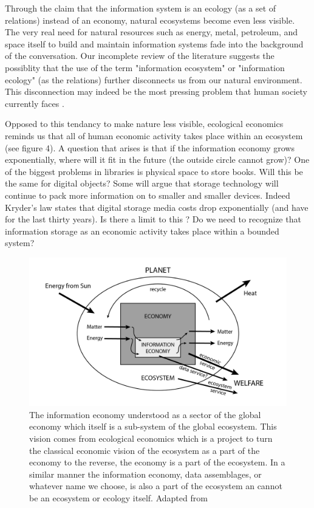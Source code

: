 Through the claim that the information system is an ecology (as a set of relations) instead of an economy, natural ecosystems become even less visible. The very real need for natural resources such as energy, metal, petroleum, and space itself to build and maintain information systems fade into the background of the conversation. Our incomplete review of the literature suggests the possiblity that the use of the term "information ecosystem" or "information ecology" (as the relations) further disconnects us from our natural environment.  This disconnection may indeed be the most pressing problem that human society currently faces \citep{worthy_2013}.

Opposed to this tendancy to make nature less visible, ecological economics reminds us that all of human economic activity takes place within an ecosystem (see figure 4).  A question that arises is that if the information economy grows exponentially, where will it fit in the future (the outside circle cannot grow)? One of the biggest problems in libraries is physical space to store books. Will this be the same for digital objects? Some will argue that storage technology will continue to pack more information on to smaller and smaller devices. Indeed Kryder's law states that digital storage media costs drop exponentially (and have for the last thirty years). Is there a limit to this \citep[cf.][]{rosenthal_2012}? Do we need to recognize that information storage as an economic activity takes place within a bounded system?

\begin{figure}[!ht]
  \centering
    \includegraphics[width=5.5in]{figures/ecologicalecon}
  \caption{The information economy understood as a sector of the global economy which itself is a sub-system of the global ecosystem. This vision comes from ecological economics which is a project to turn the classical economic vision of the ecosystem as a part of the economy to the reverse, the economy is a part of the ecosystem. In a similar manner the information economy, data assemblages, or whatever name we choose, is also a part of the ecosystem an cannot be an ecosystem or ecology itself. Adapted from \citep[][p. 18]{daly_2004}}
\end{figure}



